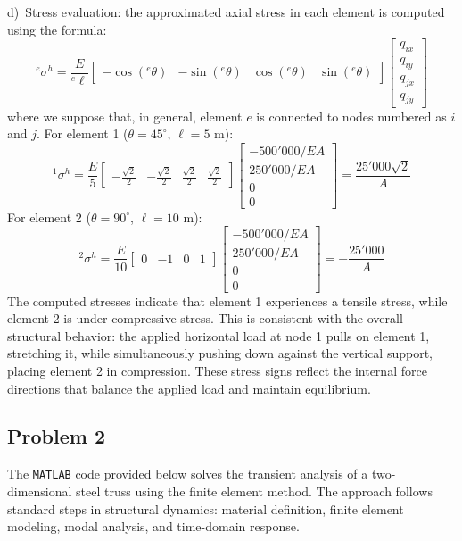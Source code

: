 \documentclass[12pt]{article}
\begin{document}
\vspace{0.3cm}
\noindent d)\ Stress evaluation: the approximated axial stress in each element is computed using the formula:
\[
    {}^e\sigma^h = \frac{E}{{}^e\ell} \begin{bmatrix} -\cos({}^e\theta) & -\sin({}^e\theta) & \cos({}^e\theta) & \sin({}^e\theta) \end{bmatrix} \begin{bmatrix}
        q_{ix} \\ q_{iy} \\ q_{jx} \\ q_{jy}
    \end{bmatrix}
\]
where we suppose that, in general, element $e$ is connected to nodes numbered as $i$ and $j$.
For element 1 ($\theta = 45^\circ$, $\ell = 5$ m):
\[
    {}^1\sigma^h = \frac{E}{5} \begin{bmatrix} -\frac{\sqrt{2}}{2} & -\frac{\sqrt{2}}{2} & \frac{\sqrt{2}}{2} & \frac{\sqrt{2}}{2} \end{bmatrix} \begin{bmatrix}
        -500'000/EA \\ 250'000/EA \\ 0 \\ 0
    \end{bmatrix} = \frac{25'000\sqrt{2}}{A}
\]
For element 2 ($\theta = 90^\circ$, $\ell = 10$ m):
\[
    {}^2\sigma^h = \frac{E}{10} \begin{bmatrix} 0 & -1 & 0 & 1 \end{bmatrix} \begin{bmatrix}
        -500'000/EA \\ 250'000/EA \\ 0 \\ 0
    \end{bmatrix} = -\frac{25'000}{A}
\]
The computed stresses indicate that element 1 experiences a tensile stress, while element 2 is under compressive stress. This is consistent with the overall structural behavior: the applied horizontal load at node 1 pulls on element 1, stretching it, while simultaneously pushing down against the vertical support, placing element 2 in compression. These stress signs reflect the internal force directions that balance the applied load and maintain equilibrium.

\subsection*{Problem 2}
The \texttt{MATLAB} code provided below solves the transient analysis of a two-dimensional steel truss using the finite element method. The approach follows standard steps in structural dynamics: material definition, finite element modeling, modal analysis, and time-domain response.
\end{document}
